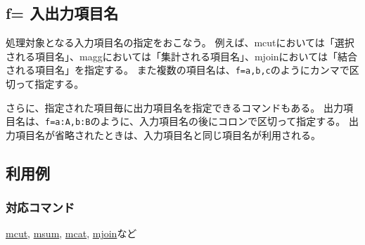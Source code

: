 
%

\subsection{f= 入出力項目名\label{sect:option_f}}

処理対象となる入力項目名の指定をおこなう。
例えば、mcutにおいては「選択される項目名」、maggにおいては「集計される項目名」、mjoinにおいては「結合される項目名」を指定する。
また複数の項目名は、\verb|f=a,b,c|のようにカンマで区切って指定する。

さらに、指定された項目毎に出力項目名を指定できるコマンドもある。
出力項目名は、\verb|f=a:A,b:B|のように、入力項目名の後にコロンで区切って指定する。
出力項目名が省略されたときは、入力項目名と同じ項目名が利用される。

\subsection*{利用例}


\subsubsection*{対応コマンド}
\hyperref[sect:mcut]{mcut},
\hyperref[sect:msum]{msum},
\hyperref[sect:mcat]{mcat},
\hyperref[sect:mjoin]{mjoin}など

%


